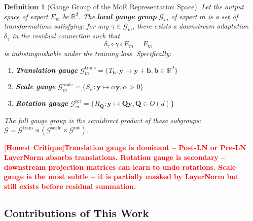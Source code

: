 \documentclass[12pt,a4paper]{article}
\newtheorem{definition}[theorem]{Definition}
\theoremstyle{remark}
\newcommand{\R}{\mathbb{R}}
\newcommand{\G}{\mathcal{G}}
\newcommand{\honestcrit}[1]{%
    \textcolor{red}{\textbf{[Honest Critique]#1}}%
}
\begin{document}
\begin{definition}[Gauge Group of the MoE Representation Space]\label{def:gauge_group}
Let the output space of expert $E_m$ be $\R^d$. The \textbf{local gauge group} $\G_m$ of expert $m$ is a set of transformations satisfying: for any $\gamma \in \G_m$, there exists a downstream adaptation $\delta_\gamma$ in the residual connection such that
\begin{equation}
    \delta_\gamma \circ \gamma \circ E_m = E_m
\end{equation}
is indistinguishable under the training loss. Specifically:
\begin{enumerate}[label=(\roman*)]
    \item \textbf{Translation gauge} $\G_m^{\text{trans}} = \{T_{\mathbf{b}} : \mathbf{y} \mapsto \mathbf{y} + \mathbf{b}, \mathbf{b} \in \R^d\}$
    \item \textbf{Scale gauge} $\G_m^{\text{scale}} = \{S_{\alpha} : \mathbf{y} \mapsto \alpha \mathbf{y}, \alpha > 0\}$
    \item \textbf{Rotation gauge} $\G_m^{\text{rot}} = \{R_{\mathbf{Q}} : \mathbf{y} \mapsto \mathbf{Q}\mathbf{y}, \mathbf{Q} \in O(d)\}$
\end{enumerate}
The full gauge group is the semidirect product of these subgroups: $\G = \G^{\text{trans}} \rtimes (\G^{\text{scale}} \times \G^{\text{rot}})$.
\end{definition}

\honestcrit{Translation gauge is dominant -- Post-LN or Pre-LN LayerNorm absorbs translations. Rotation gauge is secondary -- downstream projection matrices can learn to undo rotations. Scale gauge is the most subtle -- it is partially masked by LayerNorm but still exists before residual summation.}

\subsection{Contributions of This Work}
\end{document}

